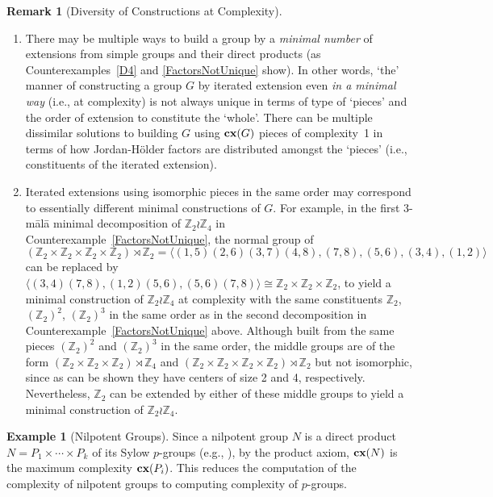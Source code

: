 \documentclass[a4paper,11pt]{amsart}
\theoremstyle{definition}
\newtheorem{example}{Example}
\newtheorem{remark}[theorem]{Remark}
\newcommand{\cx}{\mbox{\bf cx}}
\newcommand{\Z}{\mathbb{Z}}
\newcommand{\1}{{\mathbf 1}}
\begin{document}
\begin{remark}[Diversity of Constructions at Complexity] \hfill\\

\vspace{-0.5cm}
\begin{enumerate}
\item  There may be multiple ways to build a group by a {\em minimal number} of extensions from simple groups and their direct products (as Counterexamples~\ref{D4} and \ref{FactorsNotUnique} show).
In other words, `the' manner of constructing a group $G$ by iterated extension even {\em in a minimal way} (i.e., at complexity) is not always unique in terms of type of `pieces' and the order of extension to constitute the `whole'. There can be multiple dissimilar solutions to building $G$ using $\cx(G)$ pieces of complexity~1 in terms of how Jordan-H\"older factors are distributed amongst the `pieces' (i.e., constituents of the iterated extension). 
\item Iterated extensions using isomorphic pieces in the same order may correspond to essentially different minimal constructions of $G$. For example, in  the first 3-m\={a}l\={a} minimal decomposition of $\Z_2\wr\Z_4$ in Counterexample~\ref{FactorsNotUnique}, the normal group of $ (\Z_2 \times \Z_2 \times \Z_2 \times \Z_2) \rtimes \Z_2 =\langle (1,5)(2,6)(3,7)(4,8), (7,8), (5,6), (3,4), (1,2) \rangle$ can be replaced by $\langle (3,4)(7,8), (1,2)(5,6), (5,6)(7,8) \rangle\cong \Z_2\times \Z_2 \times \Z_2$, to yield a minimal construction of $\Z_2\wr\Z_4$ at complexity
with the same constituents $\Z_2$, $(\Z_2)^2$,  $(\Z_2)^3$ in the same order as  in the second decomposition in Counterexample~\ref{FactorsNotUnique} above. Although built from the same pieces $(\Z_2)^2$ and  $(\Z_2)^3$ in the same order, the middle groups are of the form $(\Z_2 \times \Z_2 \times \Z_2) \rtimes \Z_4$ and $(\Z_2 \times \Z_2 \times \Z_2 \times \Z_2) \rtimes \Z_2$ but not isomorphic, since as can be shown they have centers of size 2 and 4, respectively. Nevertheless, $\Z_2$ can be extended by either of these middle groups to yield a minimal construction of $\Z_2\wr\Z_4$. 
\end{enumerate}
\end{remark}

\begin{example}[Nilpotent Groups]\label{nilpotentcpx}
Since a nilpotent group $N$ is a direct product $N=P_1\times \cdots \times P_k$ of its Sylow $p$-groups (e.g., \cite[Theorem~10.3.4]{Hall}),   by the product axiom, $\cx(N)$ is the maximum complexity $\cx(P_i)$.  This reduces the computation of the complexity of nilpotent groups to computing complexity of $p$-groups. 
\end{example}
\end{document}
